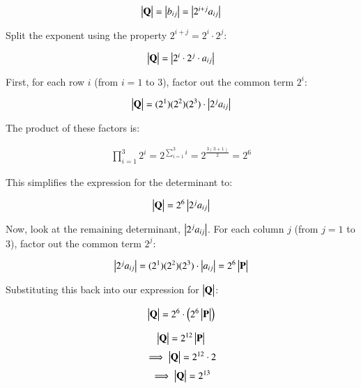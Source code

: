 \documentclass[journal]{IEEEtran}
\begin{document}
\begin{align}
\begin{vmatrix}\mathbf{Q}\end{vmatrix} = \begin{vmatrix}b_{ij}\end{vmatrix} = \begin{vmatrix}2^{i+j} a_{ij}\end{vmatrix}
\end{align}

Split the exponent using the property $2^{i+j} = 2^i \cdot 2^j$:

\begin{align}
\begin{vmatrix}\mathbf{Q}\end{vmatrix} = \begin{vmatrix}2^i \cdot 2^j \cdot a_{ij}\end{vmatrix}
\end{align}

First, for each row $i$ (from $i=1$ to $3$),   factor out the common term $2^i$:

\begin{align}
\begin{vmatrix}\mathbf{Q}\end{vmatrix} = (2^1)(2^2)(2^3) \cdot \begin{vmatrix}2^j a_{ij}\end{vmatrix}
\end{align}

The product of these factors is:

\begin{align}
\prod_{i=1}^{3} 2^i = 2^{\sum_{i=1}^{3} i} = 2^{\frac{3(3+1)}{2}} = 2^6
\end{align}

This simplifies the expression for the determinant to:

\begin{align}
\begin{vmatrix}\mathbf{Q}\end{vmatrix} = 2^{6} \begin{vmatrix}2^j a_{ij}\end{vmatrix}
\end{align}

Now, look at the remaining determinant, $\begin{vmatrix}2^j a_{ij}\end{vmatrix}$. For each column $j$ (from $j=1$ to $3$), factor out the common term $2^j$:

\begin{align}
\begin{vmatrix}2^j a_{ij}\end{vmatrix} = (2^1)(2^2)(2^3) \cdot \begin{vmatrix}a_{ij}\end{vmatrix} = 2^{6} \begin{vmatrix}\mathbf{P}\end{vmatrix}
\end{align}

Substituting this back into our expression for $\begin{vmatrix}\mathbf{Q}\end{vmatrix}$:

\begin{align}
\begin{vmatrix}\mathbf{Q}\end{vmatrix} = 2^{6} \cdot \left(2^{6} \begin{vmatrix}\mathbf{P}\end{vmatrix}\right)
\end{align}

\begin{align}
\begin{vmatrix}\mathbf{Q}\end{vmatrix} = 2^{12} \begin{vmatrix}\mathbf{P}\end{vmatrix}
\end{align}
\begin{align}
\implies\begin{vmatrix}\mathbf{Q}\end{vmatrix} = 2^{12}\cdot2
\end{align}
\begin{align}
\implies\begin{vmatrix}\mathbf{Q}\end{vmatrix} = 2^{13}
\end{align}
\end{document}
